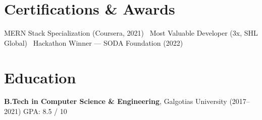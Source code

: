 \documentclass[a4paper,10.5pt]{article}
\begin{document}
\section{Certifications \& Awards}
MERN Stack Specialization (Coursera, 2021) \textbar\
Most Valuable Developer (3x, SHL Global) \textbar\
Hackathon Winner --- SODA Foundation (2022)

\section{Education}
\textbf{B.Tech in Computer Science \& Engineering}, Galgotias University (2017--2021) \quad GPA: 8.5 / 10
\end{document}
